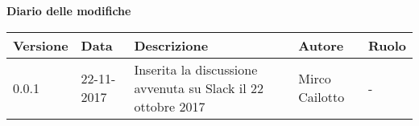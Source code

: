 \documentclass[main.tex]{subfiles}
\begin{document}
\huge \bfseries Diario delle modifiche\\
\begin{table}[htbp]
	\centering
	\renewcommand\arraystretch{1.2}

	\begin{tabularx}{\textwidth}{p{2cm}|p{2cm}|p{3cm}|p{2cm}|p{3cm}}
		\hline
		\textbf{Versione} & \textbf{Data} & \textbf{Descrizione} & \textbf{Autore} & \textbf{Ruolo}\\
		\hline
		0.0.1 & 22-11-2017 & Inserita la discussione avvenuta su Slack il 22 ottobre 2017& Mirco Cailotto & -\\
	
	\end{tabularx}

\end{table}
\end{document}
